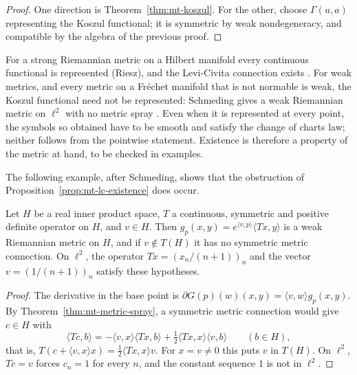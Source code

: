 \begin{proof}
  \leanok
  One direction is Theorem~\ref{thm:mt-koszul}. For the other, choose $\Gamma(u, a)$ representing
  the Koszul functional; it is symmetric by weak nondegeneracy, and compatible by the algebra of the
  previous proof.
\end{proof}

\begin{remark}
  For a strong Riemannian metric on a Hilbert manifold every continuous functional is represented
  (Riesz), and the Levi-Civita connection exists \cite[Ch.~VIII, Theorem 4.1]{Lan99}. For weak metrics, and
  every metric on a Fréchet manifold that is not normable is weak, the Koszul functional need not be
  represented: Schmeding gives a weak Riemannian metric on $\ell^2$ with no metric spray
  \cite[Example~4.22]{Sch23}. Even when it is represented at every point, the symbols so obtained
  have to be smooth and satisfy the change of charts law; neither follows from the pointwise
  statement. Existence is therefore a property of the metric at hand, to be checked in examples.
\end{remark}

The following example, after Schmeding, shows that the obstruction of
Proposition~\ref{prop:mt-lc-existence} does occur.

\begin{theorem}
  \label{thm:mt-no-levi-civita}
  \leanok
  Let $H$ be a real inner product space, $T$ a continuous, symmetric and positive definite
  operator on $H$, and $v \in H$. Then $g_p(x, y) = e^{\langle v, p\rangle} \langle Tx, y\rangle$
  is a weak Riemannian metric on $H$, and if $v \notin T(H)$ it has no symmetric metric
  connection. On $\ell^2$, the operator $Tx = (x_n / (n + 1))_n$ and the vector
  $v = (1 / (n + 1))_n$ satisfy these hypotheses.
\end{theorem}

\begin{proof}
  \leanok
  The derivative in the base point is $\partial G(p)(w)(x, y) = \langle v, w\rangle g_p(x, y)$.
  By Theorem~\ref{thm:mt-metric-spray}, a symmetric metric connection would give $c \in H$ with
  \[
    \langle Tc, b\rangle = -\langle v, x\rangle \langle Tx, b\rangle
      + \tfrac12 \langle Tx, x\rangle \langle v, b\rangle \qquad (b \in H),
  \]
  that is, $T(c + \langle v, x\rangle x) = \frac12 \langle Tx, x\rangle v$. For $x = v \neq 0$
  this puts $v$ in $T(H)$. On $\ell^2$, $Tc = v$ forces $c_n = 1$ for every $n$, and the
  constant sequence $1$ is not in $\ell^2$.
\end{proof}

